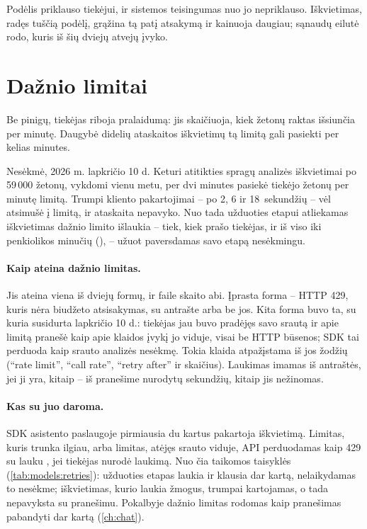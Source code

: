Podėlis priklauso tiekėjui, ir sistemos teisingumas nuo jo nepriklauso. Iškvietimas, radęs
tuščią podėlį, grąžina tą patį atsakymą ir kainuoja daugiau; sąnaudų eilutė rodo, kuris iš šių
dviejų atvejų įvyko.


\section{Dažnio limitai}\label{sec:models:ratelimits}

Be pinigų, tiekėjas riboja pralaidumą: jis skaičiuoja, kiek žetonų raktas išsiunčia per
minutę. Daugybė didelių ataskaitos iškvietimų tą limitą gali pasiekti per kelias minutes.

\begin{lessonbox}{Nesėkmė, 2026 m. lapkričio 10 d.}
Keturi atitikties spragų analizės iškvietimai po 59\,000 žetonų, vykdomi vienu metu, per dvi
minutes pasiekė tiekėjo žetonų per minutę limitą. Trumpi kliento pakartojimai -- po 2, 6 ir
18~sekundžių -- vėl atsimušė į limitą, ir ataskaita nepavyko. Nuo tada užduoties etapui
atliekamas iškvietimas dažnio limito išlaukia -- tiek, kiek prašo tiekėjas, ir iš viso iki
penkiolikos minučių (), -- užuot paversdamas savo etapą
nesėkmingu.
\end{lessonbox}

\paragraph{Kaip ateina dažnio limitas.} Jis ateina viena iš dviejų formų, ir
 faile  skaito abi. Įprasta forma -- HTTP 429,
kuris nėra biudžeto atsisakymas, su antrašte  arba be jos. Kita forma buvo ta,
su kuria susidurta lapkričio 10 d.: tiekėjas jau buvo pradėjęs savo srautą ir apie limitą
pranešė kaip apie klaidos įvykį jo viduje, visai be HTTP būsenos; SDK tai perduoda kaip srauto
analizės nesėkmę. Tokia klaida atpažįstama iš jos žodžių (\enquote{rate limit},
\enquote{call rate}, \enquote{retry after} ir skaičius). Laukimas imamas iš antraštės, jei ji
yra, kitaip -- iš pranešime nurodytų sekundžių, kitaip jis nežinomas.

\paragraph{Kas su juo daroma.} SDK asistento paslaugoje pirmiausia du kartus pakartoja
iškvietimą. Limitas, kuris trunka ilgiau, arba limitas, atėjęs srauto viduje, API perduodamas
kaip 429 su lauku , jei tiekėjas nurodė laukimą. Nuo čia taikomos
taisyklės (\cref{tab:models:retries}): užduoties etapas laukia ir klausia dar kartą, nelaikydamas
to nesėkme; iškvietimas, kurio laukia žmogus, trumpai kartojamas, o tada nepavyksta su
pranešimu. Pokalbyje dažnio limitas rodomas kaip pranešimas pabandyti dar kartą
(\cref{ch:chat}).

